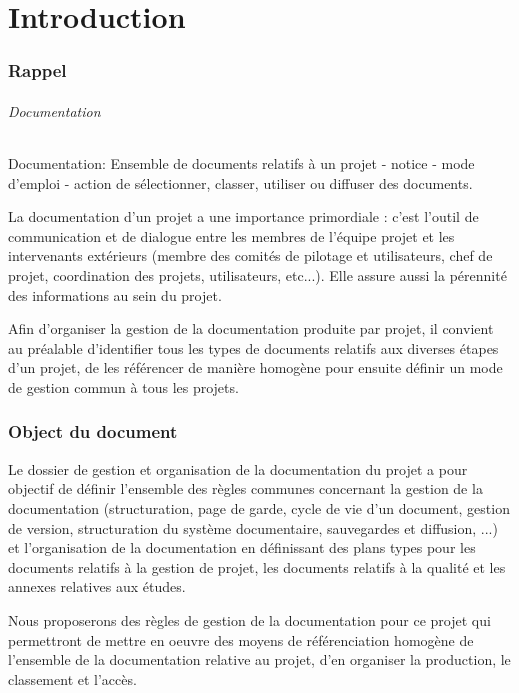 


\part{Introduction}

\section{Rappel}

\paragraph{Documentation}
Documentation: Ensemble de documents relatifs à un projet - notice - mode d’emploi - action de sélectionner, classer, utiliser ou diffuser des documents.

La documentation d’un projet a une importance primordiale : c’est l’outil de communication et de dialogue entre les membres de l’équipe projet et les intervenants extérieurs (membre des comités de pilotage et utilisateurs, chef de projet, coordination des projets, utilisateurs, etc...). Elle assure aussi la pérennité des informations au sein du projet.

Afin d’organiser la gestion de la documentation produite par projet, il convient au préalable d’identifier tous les types de documents relatifs aux diverses étapes d’un projet, de les référencer de manière homogène pour ensuite définir un mode de gestion commun à tous les projets.

\section{Object du document}

Le dossier de gestion et organisation de la documentation du projet a pour objectif de définir l’ensemble des règles
communes concernant la gestion de la documentation (structuration, page de garde, cycle de vie d’un
document, gestion de version, structuration du système documentaire, sauvegardes et diffusion, ...) et
l’organisation de la documentation en définissant des plans types pour les documents relatifs à la gestion de
projet, les documents relatifs à la qualité et les annexes relatives aux études.

Nous proposerons des règles de gestion de la documentation pour ce projet qui permettront de mettre en oeuvre des moyens
de référenciation homogène de l'ensemble de la documentation relative au projet, d'en organiser la production, le classement
et l'accès.


